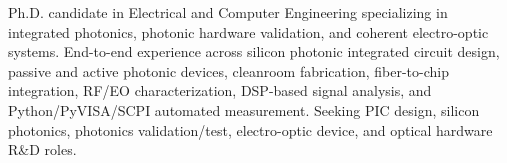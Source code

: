 
\begin{cvparagraph}
{Ph.D. candidate in Electrical and Computer Engineering specializing in integrated photonics, photonic hardware validation, and coherent electro-optic systems. End-to-end experience across silicon photonic integrated circuit design, passive and active photonic devices, cleanroom fabrication, fiber-to-chip integration, RF/EO characterization, DSP-based signal analysis, and Python/PyVISA/SCPI automated measurement. Seeking PIC design, silicon photonics, photonics validation/test, electro-optic device, and optical hardware R\&D roles.}
\end{cvparagraph}
